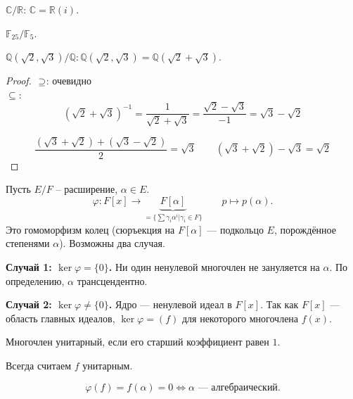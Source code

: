 \begin{examplelist}
    \item $\mathbb{C} / \mathbb{R}$: $\mathbb{C} = \mathbb{R}(i)$.
    \item $\mathbb{F}_{25} / \mathbb{F}_5$.
    \item $\mathbb{Q}(\sqrt{2}, \sqrt{3}) / \mathbb{Q}: \mathbb{Q}(\sqrt{2}, \sqrt{3}) = \mathbb{Q}(\sqrt{2} + \sqrt{3})$.
    \begin{proof}
        $\newline \supseteq$: очевидно \\
        $\subseteq$:
        \begin{equation*}
            (\sqrt{2} + \sqrt{3})^{-1} = \frac{1}{\sqrt{2} + \sqrt{3}} = \frac{\sqrt{2} - \sqrt{3}}{-1}
            = \sqrt{3} - \sqrt{2}
        \end{equation*}

        \begin{equation*}
            \frac{(\sqrt{3} + \sqrt{2}) + (\sqrt{3} - \sqrt{2})}{2} = \sqrt{3} \quad \quad (\sqrt{3} + \sqrt{2}
            ) - \sqrt{3} = \sqrt{2}
        \end{equation*}
    \end{proof}
\end{examplelist}



\begin{stmt}


Пусть $E/F$ -- расширение, $\alpha \in E$.
\[
    \varphi\colon F[x] \to \underbrace{F[\alpha]}_{=\{\sum \gamma_i \alpha^i | \gamma_i \in F\}} \qquad p \mapsto p(\alpha).
\]
Это гомоморфизм колец (сюръекция на $F[\alpha]$ --- подкольцо $E$, порождённое степенями $\alpha$).
Возможны два случая.

\textbf{Случай 1: $\ker\varphi = \{0\}$.} Ни один ненулевой многочлен не зануляется на $\alpha$.
По определению, $\alpha$ трансцендентно.

\textbf{Случай 2: $\ker\varphi \neq \{0\}$.} Ядро --- ненулевой идеал в $F[x]$.
Так как $F[x]$ --- область главных идеалов, $\ker\varphi = (f)$ для некоторого многочлена $f(x)$.

\begin{definition}
    Многочлен унитарный, если его старший коэффициент равен $1$.
\end{definition}

\begin{remark}
    Всегда считаем $f$ унитарным.
\end{remark}

\[
\varphi(f) = f(\alpha) = 0 \Leftrightarrow \alpha \text{ --- алгебраический}.
\]
\end{stmt}

